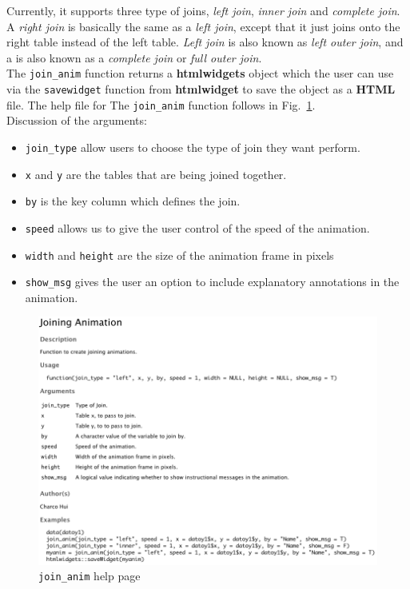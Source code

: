 Currently, it supports three type of joins, \textit{left join}, \textit{inner join} and \textit{complete join}. A \textit{right join} is basically the same as a \textit{left join}, except that it just joins onto the right table instead of the left table. \textit{Left join} is also known as \textit{left outer join}, and a  is also known as a \textit{complete join} or \textit{full outer join}. \\

The \texttt{join\_anim} function returns a \textbf{htmlwidgets} object which the user can use via the \texttt{savewidget} function from \textbf{htmlwidget} to save the object as a \textbf{HTML} file. The help file for The \texttt{join\_anim} function follows in Fig.~\ref{fig:joinanimhelp}. \\

Discussion of the arguments:
\begin{itemize}
    \item \texttt{join\_type} allow users to choose the type of join they want perform.
    \item \texttt{x} and \texttt{y} are the tables that are being joined together.
    \item \texttt{by} is the key column which defines the join.
    \item \texttt{speed} allows us to give the user control of the speed of the animation.
    \item \texttt{width} and \texttt{height} are the size of the animation frame in pixels
    \item \texttt{show\_msg} gives the user an option to include explanatory annotations in the animation.
\end{itemize}

\begin{figure}[H]
    \centering
    \includegraphics[scale = 0.5]{Masters-Thesis/img/joinanimhelp.png}
    \caption{\texttt{join\_anim} help page}
    \label{fig:joinanimhelp}
\end{figure}



